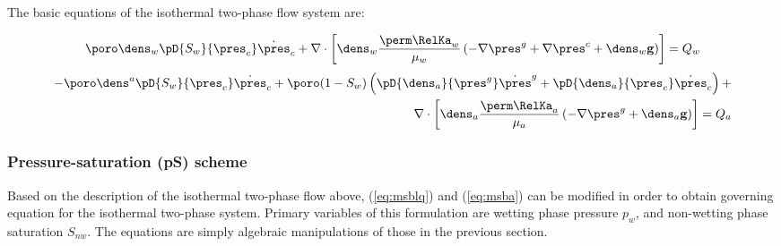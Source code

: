 The basic equations of the isothermal two-phase flow system are:

\begin{align}
\poro \dens_w \pD{S_w}{\pres_c} \dot\pres_c +
\nabla \cdot\left[\dens_w\dfrac{{\perm \RelKa}_{w}}{\mu_w}\left(-\nabla \pres^{g} +
\nabla{\pres}^{c} + \dens_w \mathbf g\right)\right] = Q_w
\end{align}
\begin{align}
- \poro \dens^a \pD{S_w}{\pres_c} \dot\pres_c+
\poro (1 -S_w)\left(\pD{\dens_a}{\pres^g}\dot\pres^g+\pD{\dens_a}{\pres_c}\dot\pres_c\right)+ \nonumber\\
\nabla \cdot \left[\dens_a\dfrac{{\perm \RelKa}_a}{\mu_a} \left(-\nabla\pres^{g} + \dens_a \mathbf g\right) \right] = Q_a
\label{eq:msbl_sim}
\end{align}

\subsubsection*{Pressure-saturation (pS) scheme}
Based on the description of the isothermal two-phase flow above, (\ref{eq:msblq}) and (\ref{eq:msba}) can be modified in order to obtain governing equation for the isothermal two-phase system. Primary variables of this formulation are wetting phase pressure $p_w$, and non-wetting phase saturation $S_{nw}$. The equations are simply algebraic manipulations of those in the previous section.